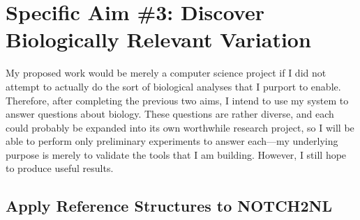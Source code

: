 \documentclass[11pt,proposal]{ucthesis}
\begin{document}

    
    
    
    
    

    

    


\section{Specific Aim \#3: Discover Biologically Relevant Variation}

My proposed work would be merely a computer science project if I did not attempt to actually do the sort of biological analyses that I purport to enable. Therefore, after completing the previous two aims, I intend to use my system to answer questions about biology. These questions are rather diverse, and each could probably be expanded into its own worthwhile research project, so I will be able to perform only preliminary experiments to answer each---my underlying purpose is merely to validate the tools that I am building. However, I still hope to produce useful results.

\subsection{Apply Reference Structures to NOTCH2NL}
\label{subsec:aim3notch}
\end{document}
